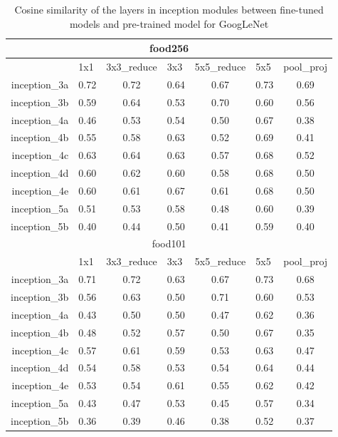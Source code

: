 \begin{table}[htbp]
  \centering
  \caption{Cosine similarity of the layers in inception modules between fine-tuned models and pre-trained model for GoogLeNet}
    \begin{tabular}{r|cccccc}
    \toprule
    \multicolumn{7}{c}{food256} \\
    \midrule
          & \multicolumn{1}{l}{1x1} & \multicolumn{1}{l}{3x3\_reduce} & \multicolumn{1}{l}{3x3} & \multicolumn{1}{l}{5x5\_reduce} & \multicolumn{1}{l}{5x5} & \multicolumn{1}{l}{pool\_proj } \\
    inception\_3a & 0.72  & 0.72  & 0.64  & 0.67  & 0.73  & 0.69 \\
    inception\_3b & 0.59  & 0.64  & 0.53  & 0.70  & 0.60  & 0.56 \\
    inception\_4a & 0.46  & 0.53  & 0.54  & 0.50  & 0.67  & 0.38 \\
    inception\_4b & 0.55  & 0.58  & 0.63  & 0.52  & 0.69  & 0.41 \\
    inception\_4c & 0.63  & 0.64  & 0.63  & 0.57  & 0.68  & 0.52 \\
    inception\_4d & 0.60  & 0.62  & 0.60  & 0.58  & 0.68  & 0.50 \\
    inception\_4e & 0.60  & 0.61  & 0.67  & 0.61  & 0.68  & 0.50 \\
    inception\_5a & 0.51  & 0.53  & 0.58  & 0.48  & 0.60  & 0.39 \\
    inception\_5b & 0.40  & 0.44  & 0.50  & 0.41  & 0.59  & 0.40 \\  \toprule
    \multicolumn{7}{c}{food101} \\ \midrule
          & \multicolumn{1}{l}{1x1 } & \multicolumn{1}{l}{3x3\_reduce} & \multicolumn{1}{l}{3x3} & \multicolumn{1}{l}{5x5\_reduce} & \multicolumn{1}{l}{5x5} & \multicolumn{1}{l}{pool\_proj } \\
    inception\_3a & 0.71  & 0.72  & 0.63  & 0.67  & 0.73  & 0.68 \\
    inception\_3b & 0.56  & 0.63  & 0.50  & 0.71  & 0.60  & 0.53 \\
    inception\_4a & 0.43  & 0.50  & 0.50  & 0.47  & 0.62  & 0.36 \\
    inception\_4b & 0.48  & 0.52  & 0.57  & 0.50  & 0.67  & 0.35 \\
    inception\_4c & 0.57  & 0.61  & 0.59  & 0.53  & 0.63  & 0.47 \\
    inception\_4d & 0.54  & 0.58  & 0.53  & 0.54  & 0.64  & 0.44 \\
    inception\_4e & 0.53  & 0.54  & 0.61  & 0.55  & 0.62  & 0.42 \\
    inception\_5a & 0.43  & 0.47  & 0.53  & 0.45  & 0.57  & 0.34 \\
    inception\_5b & 0.36  & 0.39  & 0.46  & 0.38  & 0.52  & 0.37 \\
    \bottomrule
    \end{tabular}%
  \label{tab:cosg}%
\end{table}%


